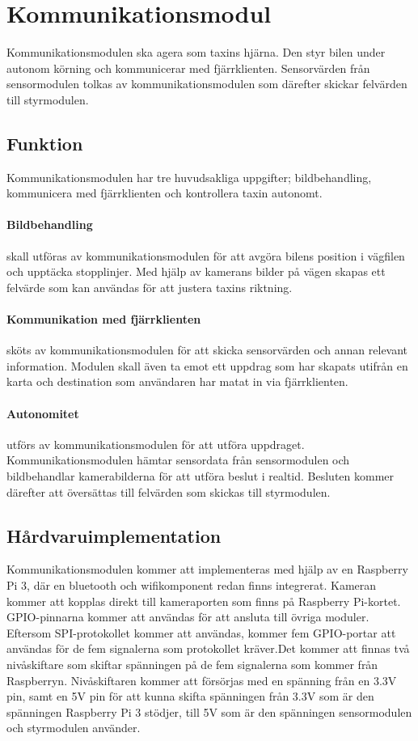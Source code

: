 \documentclass[designspec/spec.tex]{subfiles}
\begin{document}
\section{Kommunikationsmodul}
Kommunikationsmodulen ska agera som taxins hjärna. Den styr bilen under autonom
körning och kommunicerar med fjärrklienten. Sensorvärden från sensormodulen
tolkas av kommunikationsmodulen som därefter skickar felvärden till
styrmodulen.

\subsection{Funktion}
Kommunikationsmodulen har tre huvudsakliga uppgifter; bildbehandling,
kommunicera med fjärrklienten och kontrollera taxin autonomt.

\paragraph{Bildbehandling} skall utföras av kommunikationsmodulen för att
avgöra bilens position i vägfilen och upptäcka stopplinjer. Med hjälp av
kamerans bilder på vägen skapas ett felvärde som kan användas för att justera
taxins riktning.

\paragraph{Kommunikation med fjärrklienten} sköts av kommunikationsmodulen för
att skicka sensorvärden och annan relevant information. Modulen skall även ta
emot ett uppdrag som har skapats utifrån en karta och destination som
användaren har matat in via fjärrklienten.

\paragraph{Autonomitet} utförs av kommunikationsmodulen för att utföra
uppdraget. Kommunikationsmodulen hämtar sensordata från sensormodulen och
bildbehandlar kamerabilderna för att utföra beslut i realtid. Besluten kommer
därefter att översättas till felvärden som skickas till styrmodulen.

\subsection{Hårdvaruimplementation} 
Kommunikationsmodulen kommer att implementeras med hjälp av en Raspberry Pi 3,
där en bluetooth och wifikomponent redan finns integrerat. Kameran kommer att
kopplas direkt till kameraporten som finns på Raspberry Pi-kortet.
GPIO-pinnarna  kommer att användas för att ansluta till övriga moduler.
Eftersom SPI-protokollet kommer att användas, kommer fem GPIO-portar att
användas för de fem signalerna som protokollet kräver.Det kommer att finnas två
nivåskiftare som skiftar spänningen på de fem signalerna som kommer från
Raspberryn. Nivåskiftaren kommer att försörjas med en spänning från en 3.3V
pin, samt en 5V pin för att kunna skifta
spänningen från 3.3V som är den spänningen Raspberry Pi 3 stödjer, till 5V som
är den spänningen sensormodulen och styrmodulen använder.
\end{document}
